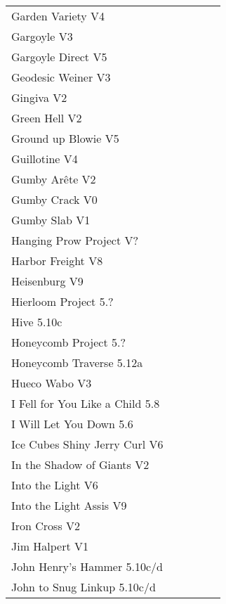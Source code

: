 \begin{flushleft}
\begin{center}
\begin{supertabular}{p{0.76\linewidth}p{0.08\linewidth}}
Garden Variety V4 & \pageref{rt:Garden Variety} \\
Gargoyle V3 & \pageref{rt:Gargoyle} \\
Gargoyle Direct V5 & \pageref{vr:Gargoyle Direct} \\
Geodesic Weiner V3 & \pageref{rt:Geodesic Weiner} \\
Gingiva V2 & \pageref{rt:Gingiva} \\
Green Hell V2 & \pageref{rt:Green Hell} \\
Ground up Blowie V5 & \pageref{rt:Ground up Blowie} \\
Guillotine V4 & \pageref{rt:Guillotine} \\
Gumby Arête V2 & \pageref{rt:Gumby Arête} \\
Gumby Crack V0 & \pageref{rt:Gumby Crack} \\
Gumby Slab V1 & \pageref{rt:Gumby Slab} \\
Hanging Prow Project V? & \pageref{rt:Hanging Prow Project} \\
Harbor Freight V8 & \pageref{vr:Harbor Freight} \\
Heisenburg V9 & \pageref{rt:Heisenburg} \\
Hierloom Project 5.? & \pageref{rt:Hierloom Project} \\
Hive 5.10c & \pageref{rt:Hive} \\
Honeycomb Project 5.? & \pageref{rt:Honeycomb Project} \\
Honeycomb Traverse 5.12a & \pageref{vr:Honeycomb Traverse} \\
Hueco Wabo V3 & \pageref{rt:Hueco Wabo} \\
I Fell for You Like a Child 5.8 & \pageref{rt:I Fell for You Like a Child} \\
I Will Let You Down 5.6 & \pageref{rt:I Will Let You Down} \\
Ice Cubes Shiny Jerry Curl V6 & \pageref{rt:Ice Cubes Shiny Jerry Curl} \\
In the Shadow of Giants V2 & \pageref{rt:In the Shadow of Giants} \\
Into the Light V6 & \pageref{rt:Into the Light} \\
Into the Light Assis V9 & \pageref{vr:Into the Light Assis} \\
Iron Cross V2 & \pageref{vr:Iron Cross} \\
Jim Halpert V1 & \pageref{rt:Jim Halpert} \\
John Henry's Hammer 5.10c/d & \pageref{rt:John Henry's Hammer} \\
John to Snug Linkup 5.10c/d & \pageref{vr:John to Snug Linkup} \\

\end{supertabular}
\end{center}
\end{flushleft}
